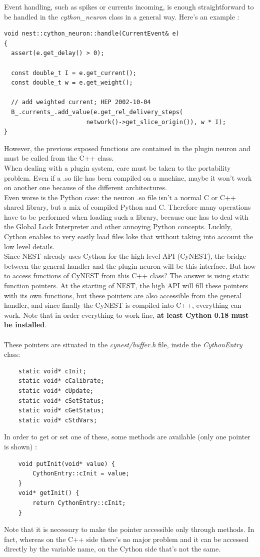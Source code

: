 \documentclass{article}
\begin{document}
Event handling, such as spikes or currents incoming, is enough straightforward to be handled in the \emph{cython\_neuron} class in a general way. Here's an example :
\begin{verbatim}
void nest::cython_neuron::handle(CurrentEvent& e)
{
  assert(e.get_delay() > 0);

  const double_t I = e.get_current();
  const double_t w = e.get_weight();

  // add weighted current; HEP 2002-10-04
  B_.currents_.add_value(e.get_rel_delivery_steps(
                       network()->get_slice_origin()), w * I);
}
\end{verbatim}
However, the previous exposed functions are contained in the plugin neuron and must be called from the C++ class.\\
When dealing with a plugin system, care must be taken to the portability problem. Even if a .so file has been compiled on a machine, maybe it won't work on another one because of the different architectures.\\
Even worse is the Python case: the neuron .so file isn't a normal C or C++ shared library, but a mix of compiled Python and C. Therefore many operations have to be performed when loading such a library, because one has to deal with the Global Lock Interpreter and other annoying Python concepts. Luckily, Cython enables to very easily load files loke that without taking into account the low level details.\\
Since NEST already uses Cython for the high level API (CyNEST), the bridge between the general handler and the plugin neuron will be this interface. But how to access functions of CyNEST from this C++ class? The answer is using static function pointers. At the starting of NEST, the high API  will fill these pointers with its own functions, but these pointers are also accessible from the general handler, and since finally the CyNEST is compiled into C++, everything can work. Note that in order everything to work fine, \textbf{at least Cython 0.18 must be installed}. \\ \\
These pointers are situated in the \emph{cynest/buffer.h} file, inside the \emph{CythonEntry} class:
\begin{verbatim}
	static void* cInit;
	static void* cCalibrate;
	static void* cUpdate;
	static void* cSetStatus;
	static void* cGetStatus;
	static void* cStdVars;
\end{verbatim}
In order to get or set one of these, some methods are available (only one pointer is shown) :
\begin{verbatim}
	void putInit(void* value) {
		CythonEntry::cInit = value;
	}
	void* getInit() {
		return CythonEntry::cInit;
	}
\end{verbatim}
Note that it is necessary to make the pointer accessible only through methods. In fact, whereas on the C++ side there's no major problem and it can be accessed directly by the variable name, on the Cython side that's not the same.
\end{document}
